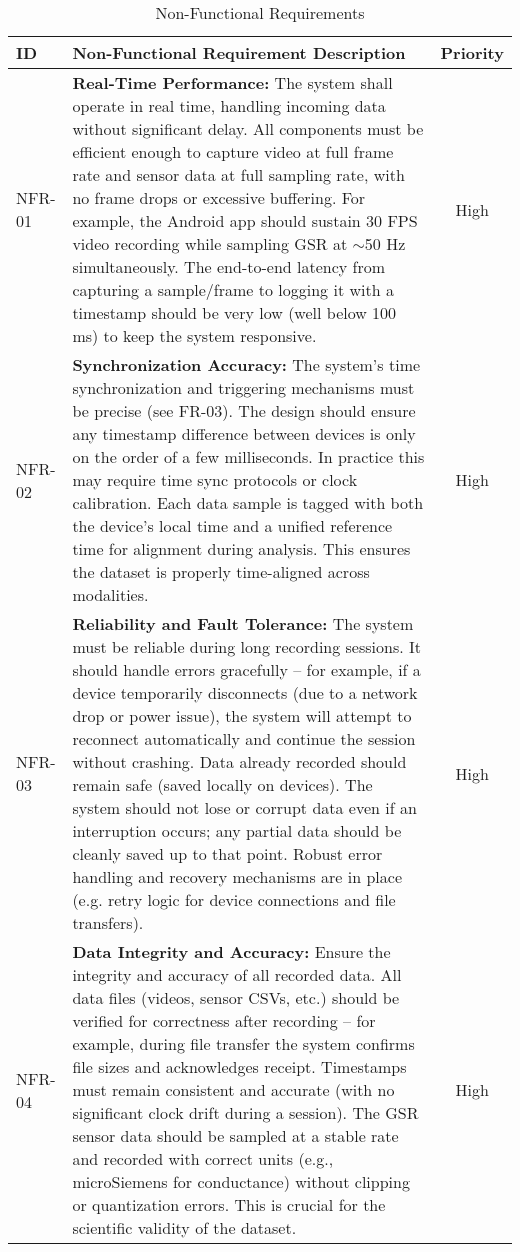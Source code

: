 \begin{table}[htbp]
\centering
\caption{Non-Functional Requirements}
\label{tab:non-functional-requirements}
\begin{tabular}{|p{1cm}|p{10cm}|c|}
\hline
\textbf{ID} & \textbf{Non-Functional Requirement Description} & \textbf{Priority} \\
\hline
NFR-01 & \textbf{Real-Time Performance:} The system shall operate in real time, handling incoming data without significant delay. All components must be efficient enough to capture video at full frame rate and sensor data at full sampling rate, with no frame drops or excessive buffering. For example, the Android app should sustain 30 FPS video recording while sampling GSR at $\sim$50 Hz simultaneously. The end-to-end latency from capturing a sample/frame to logging it with a timestamp should be very low (well below 100 ms) to keep the system responsive. & High \\
\hline
NFR-02 & \textbf{Synchronization Accuracy:} The system's time synchronization and triggering mechanisms must be precise (see FR-03). The design should ensure any timestamp difference between devices is only on the order of a few milliseconds. In practice this may require time sync protocols or clock calibration. Each data sample is tagged with both the device's local time and a unified reference time for alignment during analysis. This ensures the dataset is properly time-aligned across modalities. & High \\
\hline
NFR-03 & \textbf{Reliability and Fault Tolerance:} The system must be reliable during long recording sessions. It should handle errors gracefully -- for example, if a device temporarily disconnects (due to a network drop or power issue), the system will attempt to reconnect automatically and continue the session without crashing. Data already recorded should remain safe (saved locally on devices). The system should not lose or corrupt data even if an interruption occurs; any partial data should be cleanly saved up to that point. Robust error handling and recovery mechanisms are in place (e.g. retry logic for device connections and file transfers). & High \\
\hline
NFR-04 & \textbf{Data Integrity and Accuracy:} Ensure the integrity and accuracy of all recorded data. All data files (videos, sensor CSVs, etc.) should be verified for correctness after recording -- for example, during file transfer the system confirms file sizes and acknowledges receipt. Timestamps must remain consistent and accurate (with no significant clock drift during a session). The GSR sensor data should be sampled at a stable rate and recorded with correct units (e.g., microSiemens for conductance) without clipping or quantization errors. This is crucial for the scientific validity of the dataset. & High \\

\end{tabular}
\end{table}
